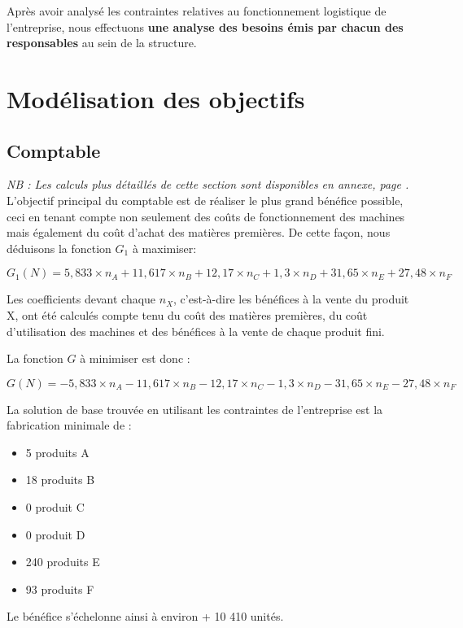 \documentclass[a4paper,10pt]{article}
\begin{document}
Après avoir analysé les contraintes relatives au fonctionnement logistique de l'entreprise, nous effectuons \textbf{une analyse des besoins émis par chacun des responsables} au sein de la structure.


\section{Modélisation des objectifs}


\subsection{Comptable}

\emph{NB : Les calculs plus détaillés de cette section sont disponibles en annexe, page \pageref{annexe}.} \\

L'objectif principal du comptable est de réaliser le plus grand bénéfice possible, ceci en tenant compte non seulement des coûts de fonctionnement des machines mais également du coût d'achat des matières premières. De cette façon, nous déduisons la fonction $G_1$ à maximiser:

$$G_1(N) = 5,833 \times n_A + 11,617 \times n_B + 12,17 \times n_C + 1,3 \times n_D + 31,65 \times n_E + 27,48 \times n_F$$

Les coefficients devant chaque $n_X$, c'est-à-dire les bénéfices à la vente du produit X, ont été calculés compte tenu du coût des matières premières, du coût d'utilisation des machines et des bénéfices à la vente de chaque produit fini.\newline


La fonction $G$ à minimiser est donc :

$$G(N) = -5,833 \times n_A - 11,617 \times n_B - 12,17 \times n_C - 1,3 \times n_D - 31,65 \times n_E - 27,48 \times n_F$$

La solution de base trouvée en utilisant les contraintes de l'entreprise est la fabrication minimale de :\newline
\begin{itemize}
\item[\textbullet] 5 produits A
\item[\textbullet] 18 produits B
\item[\textbullet] 0 produit C
\item[\textbullet] 0 produit D
\item[\textbullet] 240 produits E
\item[\textbullet] 93 produits F\newline
\end{itemize}
Le bénéfice s'échelonne ainsi à environ + 10 410 unités.\newline
\end{document}
